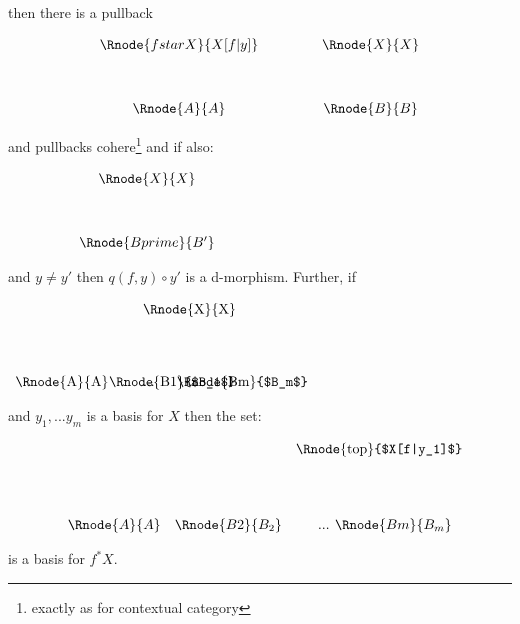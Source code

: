 \documentclass[10pt,a4paper]{scrartcl}
\begin{document}
\begin{enumerate} [(i)]
then there is a pullback 
\vspace{3mm}
\begin{center}
\begin{displaymath}
\begin{array}{cp{.9cm}c}
\Rnode{fstarX}{X[f|y]} & & \Rnode{X}{X}\\ [1.2cm]
\Rnode{A}{A}         & & \Rnode{B}{B}
\end{array}
\end{displaymath}
\end{center}
and pullbacks cohere\footnote{exactly as for contextual category}
and if also:
\begin{center}
$
\begin{array}{cp{.9cm}c}
            & & \Rnode{X}{X} \\ [1.2cm]
& & \Rnode{Bprime}{B'} \\
\end{array}
$
\end{center}
and $y \neq y'$ then $q(f,y) \circ y'$ is a d-morphism. 
\noindent Further, if
\begin{center}
$
\begin{array}{p{2cm}p{0.5cm}p{0.5cm}p{0.5cm}}
& & \Rnode{X}{X}& \\ [1.4cm]
\Rnode{A}{A} & \Rnode{B1}{$B_1$} & ... & \Rnode{Bm}{$B_m$}\\
\end{array}
$
\end{center}
and $y_1,...y_m$ is a basis for $X$ 
\noindent then the set:
\vspace{2mm}
\begin{center}
\setlength{\arraycolsep}{0.3cm}
\begin{displaymath}
\begin{array}{ccp{0.2cm}p{0.075cm}c}
&&\Rnode{top}{$X[f|y_1]$}& & \\[1.5cm]
\Rnode{A}{A}&\Rnode{B2}{B_2}&& ... & \Rnode{Bm}{B_m}\\
\end{array}
\end{displaymath}
\end{center}
is a basis for  $f^*X$.



\end{enumerate}
\end{document}
